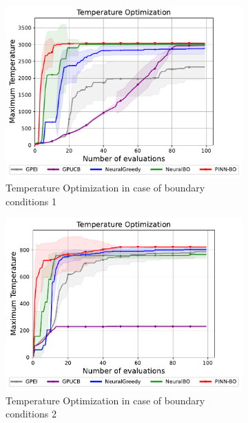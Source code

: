 \begin{figure}[H]
    \centering
    \begin{subfigure}[b]{0.49\textwidth}
        \centering
    \includegraphics[width=\textwidth]{Figures/PINN-BO/Heat_dim_2_bc1.pdf}
        \caption{Temperature Optimization in case of boundary conditions 1}
 \label{fig:heat_1_opt}
    \end{subfigure}
    \hfill
    \begin{subfigure}[b]{0.49\textwidth}
        \centering
        \includegraphics[width=1\textwidth]{Figures/PINN-BO/Heat_dim_2_bc2.pdf}
        \caption{Temperature Optimization in case of boundary conditions 2}
        \label{fig:heat_2_opt}
    \end{subfigure}
    \hfill
    \begin{subfigure}[b]{0.5\textwidth}

\end{subfigure}
\end{figure}
